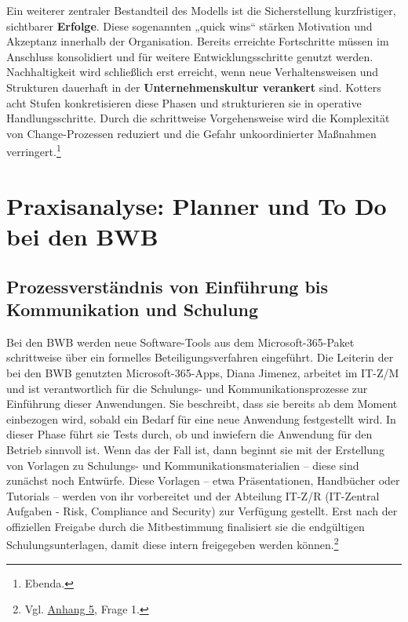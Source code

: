\documentclass[
    12pt, 
    a4paper,
    ]{scrartcl} %
\begin{document}
Ein weiterer zentraler Bestandteil des Modells ist die Sicherstellung kurzfristiger, sichtbarer \textbf{Erfolge}. Diese sogenannten „quick wins“ stärken Motivation und Akzeptanz innerhalb der Organisation. Bereits erreichte Fortschritte müssen im Anschluss konsolidiert und für weitere Entwicklungsschritte genutzt werden. Nachhaltigkeit wird schließlich erst erreicht, wenn neue Verhaltensweisen und Strukturen dauerhaft in der \textbf{Unternehmenskultur verankert} sind. Kotters acht Stufen konkretisieren diese Phasen und strukturieren sie in operative Handlungsschritte. Durch die schrittweise Vorgehensweise wird die Komplexität von Change-Prozessen reduziert und die Gefahr unkoordinierter Maßnahmen verringert.\footnote{Ebenda.}

\section{Praxisanalyse: Planner und To Do bei den BWB}
\subsection{Prozessverständnis von Einführung bis Kommunikation und Schulung}
Bei den BWB werden neue Software-Tools aus dem Microsoft-365-Paket schrittweise über ein formelles Beteiligungsverfahren eingeführt. Die Leiterin der bei den BWB genutzten Microsoft-365-Apps, Diana Jimenez, arbeitet im IT-Z/M und ist verantwortlich für die Schulungs- und Kommunikationsprozesse zur Einführung dieser Anwendungen. Sie beschreibt, dass sie bereits ab dem Moment einbezogen wird, sobald ein Bedarf für eine neue Anwendung festgestellt wird. In dieser Phase führt sie Tests durch, ob und inwiefern die Anwendung für den Betrieb sinnvoll ist. Wenn das der Fall ist, dann beginnt sie mit der Erstellung von Vorlagen zu Schulungs- und Kommunikationsmaterialien – diese sind zunächst noch Entwürfe. Diese Vorlagen – etwa Präsentationen, Handbücher oder Tutorials – werden von ihr vorbereitet und der Abteilung IT-Z/R (IT-Zentral Aufgaben - Risk, Compliance and Security) zur Verfügung gestellt. Erst nach der offiziellen Freigabe durch die Mitbestimmung finalisiert sie die endgültigen Schulungsunterlagen, damit diese intern freigegeben werden können.\footnote{Vgl. \hyperref[sec:Anhang5]{Anhang 5}, Frage 1.}
\end{document}
